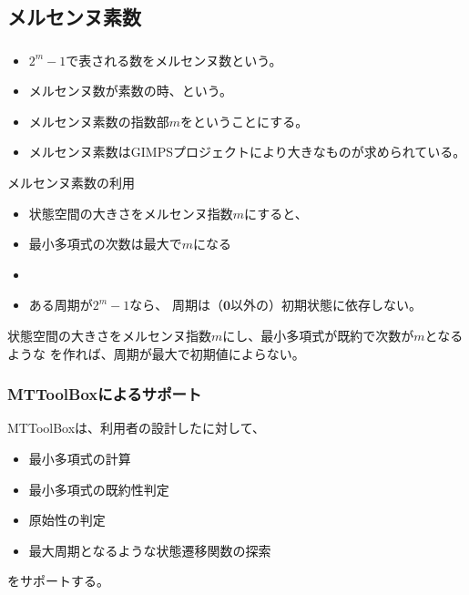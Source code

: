 \documentclass[cjk, dvips, handout, trans, xcolor=dvipsnames]{beamer}
\begin{document}
\subsection{メルセンヌ素数}
\begin{frame}[t]
  \frametitle{\insertsubsection}
  \begin{itemize}
  \item $2^m-1$で表される数をメルセンヌ数という。
  \item メルセンヌ数が素数の時、という。
  \item メルセンヌ素数の指数部$m$をということにする。
  \item メルセンヌ素数はGIMPSプロジェクトにより大きなものが求められている。
  \end{itemize}

  \pause
  \begin{block}{メルセンヌ素数の利用}
    \begin{itemize}
    \item[] 状態空間の大きさをメルセンヌ指数$m$にすると、
    \item 最小多項式の次数は最大で$m$になる
    \item {}
    \item ある周期が$2^m-1$なら、
      周期は（$\mathbf{0}$以外の）初期状態に依存しない。
    \end{itemize}
    状態空間の大きさをメルセンヌ指数$m$にし、最小多項式が既約で次数が$m$となるような
    \FLPRNG を作れば、周期が最大で初期値によらない。
  \end{block}
\end{frame}

\begin{frame}[t]
  \frametitle{MTToolBoxによるサポート}
  MTToolBoxは、利用者の設計した\FLPRNG に対して、
  \begin{itemize}
  \item 最小多項式の計算
  \item 最小多項式の既約性判定
  \item 原始性の判定
  \item 最大周期となるような状態遷移関数の探索
  \end{itemize}
  をサポートする。
\end{frame}
\end{document}
